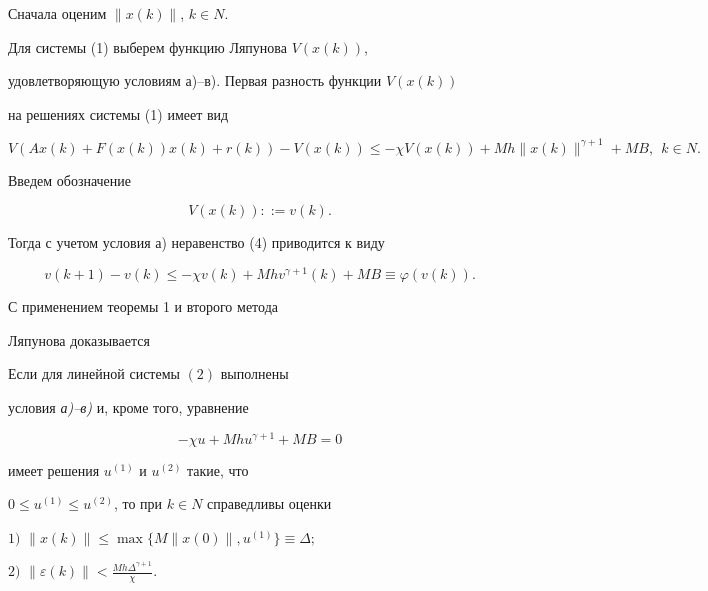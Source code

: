 Сначала оценим $\|x(k)\|$, $k\in N$.





Для системы (1) выберем функцию Ляпунова $V(x(k))$,


удовлетворяющую условиям а)--в). Первая разность функции $V(x(k))$


на решениях системы (1) имеет вид


\begin{equation}


V(Ax(k)+F(x(k))x(k)+r(k))-V(x(k))\le


-\chi V(x(k))+Mh\|x(k)\|^{\gamma+1}+MB,\ \ k\in N.


\end{equation}





Введем обозначение


$$


V(x(k))::=v(k).


$$


Тогда с учетом условия а) неравенство (4) приводится к виду


$$


v(k+1)-v(k)\le -\chi v(k)+Mhv^{\gamma+1}(k)+MB\equiv\varphi(v(k)).


$$


С применением теоремы 1 и  второго метода


Ляпунова доказывается





\begin{thm}


Если для линейной системы $(2)$ выполнены


условия {\em а)--в)} и, кроме того, уравнение


\begin{equation}


-\chi u+Mhu^{\gamma+1}+MB=0


\end{equation}


имеет решения $u^{(1)}$ и $u^{(2)}$ такие, что


$0\le u^{(1)}\le u^{(2)}$, то при $k\in N$ справедливы оценки





$1)$ $\|x(k)\|\le\max\{M\|x(0)\|, u^{(1)}\}\equiv\Delta;$





$2)$ $\|\varepsilon(k)\|<\displaystyle\frac{Mh\Delta^{\gamma+1}}{\chi}.$


\end{thm}





